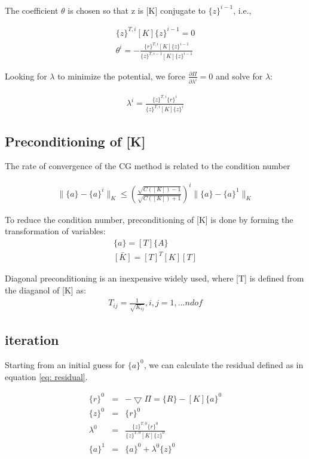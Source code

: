 \documentclass[paper=a4, fontsize=11pt]{article} %
\begin{document}
The coefficient $\theta$ is chosen so that {z} is [K] conjugate to $\{z\}^{i-1}$, i.e.,

\begin{eqnarray}
\{z\}^{T, i} [K] \{z\} ^{i-1} =0 \nonumber\\
\theta^i = - \frac{\{r\}^{T,i} [K] \{z\} ^ {i-1}} {\{z\} ^{T,i-1} [K] \{z\}^{i-1} }
\end{eqnarray}

Looking for $\lambda$ to minimize the potential, we force $\frac{\partial {\Pi}}{\partial \lambda ^i} =0 $ and solve for $\lambda$:

\begin{eqnarray}
\lambda ^i = \frac{ \{z\}^{T,i} \{r\}^i} { \{z\}^{T,i}[K]\{z\}^i}
\end{eqnarray}

\subsection{Preconditioning of [K]}
The rate of convergence of the CG method is related to the condition number

\begin{eqnarray}
\| \{a\} - \{ a\}^i \| _K \leq (\frac{ \sqrt{C([K]) -1} }{ \sqrt{C([K]) + 1} }) ^i \| \{a\} - \{a\} ^1 \| _K
\end{eqnarray}

To reduce the condition number, preconditioning of [K] is done by forming the transformation of variables:
\begin{eqnarray}
\{a\} = [T] \{ A\} \nonumber\\
\bar{[K]} = [T] ^T [K] [T] 
\end{eqnarray} 

Diagonal preconditioning is an inexpensive widely used, where [T] is defined from the diaganol of [K] as:
\begin{eqnarray}
T_{ij} = \frac{1} { \sqrt{ K_{ij} } }, i,j = 1, ... ndof 
\end{eqnarray}

\subsection{iteration}
Starting from an initial guess for $\{a\}^0$, we can calculate the residual defined as in equation \ref{eq: residual}.

\begin{eqnarray}
\label{eq: residual}
\{r\}^0 &=& - \bigtriangledown \Pi = \{R\} - [K] \{a\}^0 \nonumber\\
\{z\}^0 &=& \{r\}^0 \nonumber\\
\lambda ^0 &=& \frac{ \{z\}^{T,0} \{r\}^0} { \{z\}^{T,0}[K]\{z\}^0} \nonumber\\
\{a\}^{1} &=& \{a\}^0 + \lambda^0 \{z\}^0
\end{eqnarray}
\end{document}
